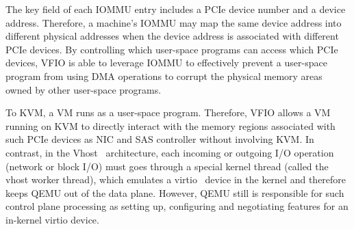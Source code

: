 The key field of each IOMMU entry includes a PCIe device number and a device address.
Therefore, a machine's IOMMU may map the same device address into different physical addresses when the device address is associated with different PCIe devices.
By controlling which user-space programs can access which PCIe devices, VFIO is able to leverage IOMMU to effectively prevent a user-space program 
from using DMA operations to corrupt the physical memory areas owned by other user-space programs.

To KVM, a VM runs as a user-space program.
Therefore, VFIO allows a VM running on KVM to directly interact with the memory regions associated with 
such PCIe devices as NIC and SAS controller without involving KVM.
In contrast, in the Vhost~\cite{vhost} architecture, each incoming or outgoing I/O operation (network or block I/O) must goes through 
a special kernel thread (called the vhost worker thread), which emulates a virtio~\cite{virtio} device in the kernel and therefore keeps QEMU out of the data plane.
However, QEMU still is responsible for such control plane processing as setting up, configuring and negotiating features for an in-kernel virtio device.  




